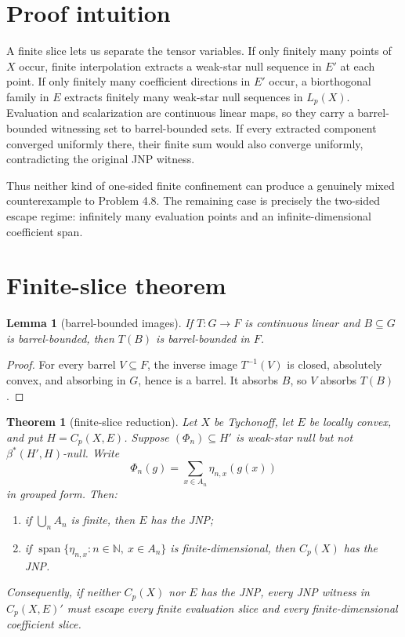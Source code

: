 \documentclass[11pt]{article}
\newtheorem{theorem}{Theorem}
\newtheorem{lemma}{Lemma}
\begin{document}
\section{Proof intuition}

A finite slice lets us separate the tensor variables.  If only finitely many
points of $X$ occur, finite interpolation extracts a weak-star null sequence
in $E'$ at each point.  If only finitely many coefficient directions in $E'$
occur, a biorthogonal family in $E$ extracts finitely many weak-star null
sequences in $L_p(X)$.  Evaluation and scalarization are continuous linear
maps, so they carry a barrel-bounded witnessing set to barrel-bounded sets.
If every extracted component converged uniformly there, their finite sum
would also converge uniformly, contradicting the original JNP witness.

Thus neither kind of one-sided finite confinement can produce a genuinely
mixed counterexample to Problem 4.8.  The remaining case is precisely the
two-sided escape regime: infinitely many evaluation points and an
infinite-dimensional coefficient span.

\section{Finite-slice theorem}

\begin{lemma}[barrel-bounded images]\label{lem:image}
If $T:G\to F$ is continuous linear and $B\subseteq G$ is barrel-bounded,
then $T(B)$ is barrel-bounded in $F$.
\end{lemma}

\begin{proof}
For every barrel $V\subseteq F$, the inverse image $T^{-1}(V)$ is closed,
absolutely convex, and absorbing in $G$, hence is a barrel.  It absorbs $B$,
so $V$ absorbs $T(B)$.
\end{proof}

\begin{theorem}[finite-slice reduction]\label{thm:main}
Let $X$ be Tychonoff, let $E$ be locally convex, and put $H=C_p(X,E)$.
Suppose $(\Phi_n)\subseteq H'$ is weak-star null but not
$\beta^*(H',H)$-null.  Write
\[
  \Phi_n(g)=\sum_{x\in A_n}\eta_{n,x}(g(x))
\]
in grouped form.  Then:
\begin{enumerate}[label=\textup{(\roman*)}]
  \item if $\bigcup_n A_n$ is finite, then $E$ has the JNP;
  \item if
  $\operatorname{span}\{\eta_{n,x}:n\in\mathbb N,\ x\in A_n\}$ is
  finite-dimensional, then $C_p(X)$ has the JNP.
\end{enumerate}
Consequently, if neither $C_p(X)$ nor $E$ has the JNP, every JNP witness in
$C_p(X,E)'$ must escape every finite evaluation slice and every
finite-dimensional coefficient slice.
\end{theorem}
\end{document}
